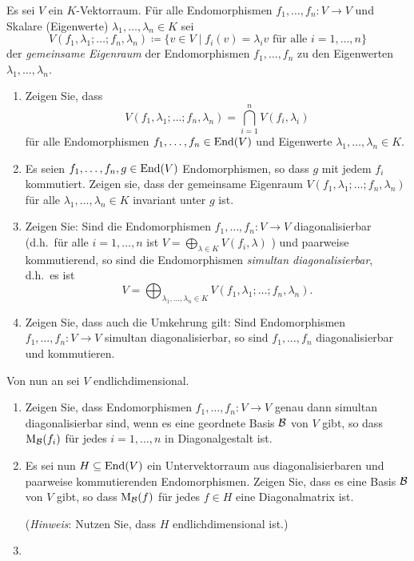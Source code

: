\begin{question}
  Es sei $V$ ein $K$-Vektorraum.
  Für alle Endomorphismen $f_1, \dotsc, f_n \colon V  \to V$ und Skalare (Eigenwerte) \mbox{$\lambda_1, \dotsc, \lambda_n \in K$} sei
  \[
              V(f_1, \lambda_1; \dotsc; f_n, \lambda_n)
    \coloneqq \{ v \in V \mid \text{$f_i(v) = \lambda_i v$ für alle $i = 1, \dotsc, n$} \}
  \]
  der \emph{gemeinsame Eigenraum} der Endomorphismen $f_1, \dotsc, f_n$ zu den Eigenwerten $\lambda_1, \dotsc, \lambda_n$.
  \begin{enumerate}[leftmargin=*]
    \item
      Zeigen Sie, dass
      \[
          V(f_1, \lambda_1; \dotsc; f_n, \lambda_n)
        = \bigcap_{i=1}^n V(f_i, \lambda_i)
      \]
      für alle Endomorphismen $f_1, \dotsc, f_n \in \operatorname{End}(V)$ und Eigenwerte $\lambda_1, \dotsc, \lambda_n \in K$.
    \item
      Es seien $f_1, \dotsc, f_n, g \in \operatorname{End}(V)$ Endomorphismen, so dass $g$ mit jedem $f_i$ kommutiert.
      Zeigen sie, dass der gemeinsame Eigenraum $V(f_1, \lambda_1; \dots; f_n, \lambda_n)$ für alle $\lambda_1, \dotsc, \lambda_n \in K$ invariant unter $g$ ist.
    \item
      Zeigen Sie: Sind die Endomorphismen $f_1, \dotsc, f_n \colon V \to V$ diagonalisierbar (d.h.\ für alle $i = 1, \dotsc, n$ ist $V = \bigoplus_{\lambda \in K} V(f_i, \lambda)$ ) und paarweise kommutierend, so sind die Endomorphismen \emph{simultan diagonalisierbar}, d.h.\ es ist
      \[
          V
        = \bigoplus_{\lambda_1, \dotsc, \lambda_n \in K}  V(f_1, \lambda_1; \dotsc; f_n, \lambda_n).
      \]
    \item
      Zeigen Sie, dass auch die Umkehrung gilt:
      Sind Endomorphismen $f_1, \dotsc, f_n \colon V \to V$ simultan diagonalisierbar, so sind $f_1, \dotsc, f_n$ diagonalisierbar und kommutieren.
  \end{enumerate}
  Von nun an sei $V$ endlichdimensional.
  \begin{enumerate}[resume]
    \item
      Zeigen Sie, dass Endomorphismen $f_1, \dotsc, f_n \colon V \to V$ genau dann simultan diagonalisierbar sind, wenn es eine geordnete Basis $\mathcal{B}$ von $V$ gibt, so dass $\operatorname{M}_{\mathcal{B}}(f_i)$ für jedes $i = 1, \dotsc, n$ in Diagonalgestalt ist.
    \item
      Es sei nun $H \subseteq \operatorname{End}(V)$ ein Untervektorraum aus diagonalisierbaren und paarweise kommutierenden Endomorphismen.
      Zeigen Sie, dass es eine Basis $\mathcal{B}$ von $V$ gibt, so dass $\operatorname{M}_{\mathcal{B}}(f)$ für jedes $f \in H$ eine Diagonalmatrix ist.
      
      (\emph{Hinweis}:
       Nutzen Sie, dass $H$ endlichdimensional ist.)
    \item
  \end{enumerate}
\end{question}


